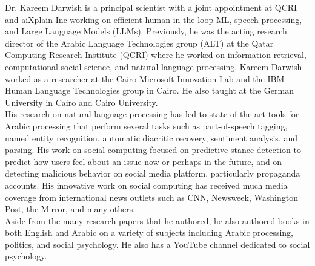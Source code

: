 Dr. Kareem Darwish is a principal scientist with a joint appointment at QCRI and aiXplain Inc working on efficient human-in-the-loop ML, speech processing, and Large Language Models (LLMs). Previously, he was the acting research director of the Arabic Language Technologies group (ALT) at the Qatar Computing Research Institute (QCRI) where he worked on information retrieval, computational social science, and natural language processing. Kareem Darwish worked as a researcher at the Cairo Microsoft Innovation Lab and the IBM Human Language Technologies group in Cairo. He also taught at the German University in Cairo and Cairo University.\\


His research on natural language processing has led to state-of-the-art tools for Arabic processing that perform several tasks such as part-of-speech tagging, named entity recognition, automatic diacritic recovery, sentiment analysis, and parsing. His work on social computing focused on predictive stance detection to predict how users feel about an issue now or perhaps in the future, and on detecting malicious behavior on social media platform, particularly propaganda accounts. His innovative work on social computing has received much media coverage from international news outlets such as CNN, Newsweek, Washington Post, the Mirror, and many others.\\


Aside from the many research papers that he authored, he also authored books in both English and Arabic on a variety of subjects including Arabic processing, politics, and social psychology. He also has a YouTube channel dedicated to social psychology.
